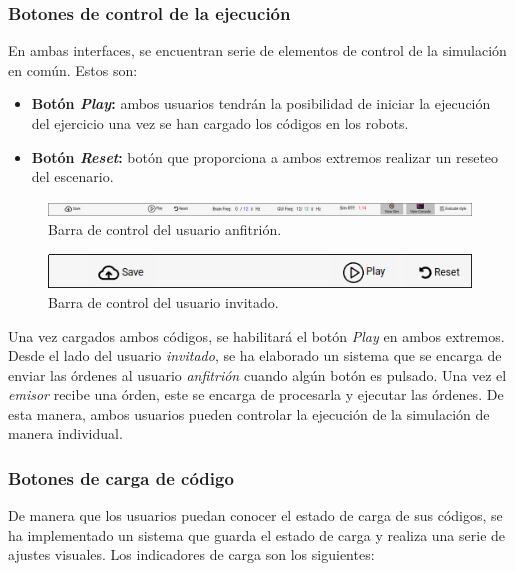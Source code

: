 \documentclass[a4paper, 12pt]{book}
\begin{document}
\subsubsection{Botones de control de la ejecución}

En ambas interfaces, se encuentran serie de elementos de control de la simulación en común. Estos son:

\begin{itemize}
\item \textbf{Botón \emph{Play}:} ambos usuarios tendrán la posibilidad de iniciar la ejecución del ejercicio una vez se han cargado los códigos en los robots.

\item \textbf{Botón \emph{Reset}:} botón que proporciona a ambos extremos realizar un reseteo del escenario.
\end{itemize}

  \begin{figure}[H]
    \includegraphics[width=15cm]{img/host_sync_control_bar.png}
    \caption{Barra de control del usuario anfitrión.}
    \label{figura:host_sync_control_bar}
  \end{figure}
  \begin{figure}[H]
    \includegraphics[width=15cm]{img/guest_sync_control_bar.png}
    \caption{Barra de control del usuario invitado.}
    \label{figura:guest_sync_control_bar}
  \end{figure}


Una vez cargados ambos códigos, se habilitará el botón \emph{Play} en ambos extremos. Desde el lado del usuario \emph{invitado}, se ha elaborado un sistema que se encarga de enviar las órdenes al usuario \emph{anfitrión} cuando algún botón es pulsado. Una vez el \emph{emisor} recibe una órden, este se encarga de procesarla y ejecutar las órdenes. De esta manera, ambos usuarios pueden controlar la ejecución de la simulación de manera individual.

\subsubsection{Botones de carga de código}

De manera que los usuarios puedan conocer el estado de carga de sus códigos, se ha implementado un sistema que guarda el estado de carga y realiza una serie de ajustes visuales. Los indicadores de carga son los siguientes:
\end{document}
